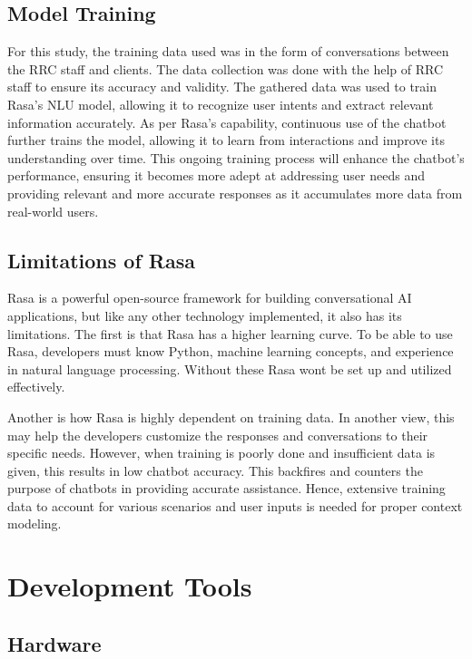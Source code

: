 \subsection{Model Training}

For this study, the training data used was in the form of conversations between the RRC staff and clients. The data collection was done with the help of RRC staff to ensure its accuracy and validity. The gathered data was used to train Rasa’s NLU model, allowing it to recognize user intents and extract relevant information accurately. As per Rasa’s capability, continuous use of the chatbot further trains the model, allowing it to learn from interactions and improve its understanding over time. This ongoing training process will enhance the chatbot’s performance, ensuring it becomes more adept at addressing user needs and providing relevant and more accurate responses as it accumulates more data from real-world users.

\subsection {Limitations of Rasa}

Rasa is a powerful open-source framework for building conversational AI applications, but like any other technology implemented, it also has its limitations. The first is that Rasa has a higher learning curve. To be able to use Rasa, developers must know Python, machine learning concepts, and experience in natural language processing. Without these Rasa wont be set up and utilized effectively. 

Another is how Rasa is highly dependent on training data. In another view, this may help the developers customize the responses and conversations to their specific needs. However, when training is poorly done and insufficient data is given, this results in low chatbot accuracy. This backfires and counters the purpose of chatbots in providing accurate assistance. Hence, extensive training data to account for various scenarios and user inputs is needed for proper context modeling.

\section{Development Tools}

\subsection{Hardware}

